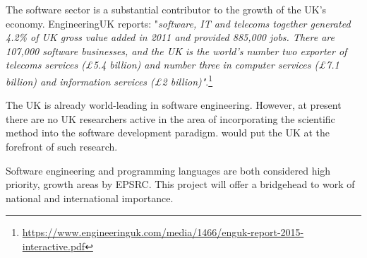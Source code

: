 The software sector is a substantial contributor to the growth of the UK's economy. EngineeringUK reports: "\textit{software, IT and telecoms together generated 4.2\% of UK gross value added in 2011 and provided 885,000 jobs. There are 107,000 software businesses, and the UK is the world's number two exporter of telecoms services (£5.4 billion) and number three in computer services (£7.1 billion) and information services (£2 billion)"}.\footnote{\url{https://www.engineeringuk.com/media/1466/enguk-report-2015-interactive.pdf}}

The UK is already world-leading in software engineering. However, at
present there are no UK researchers active in the area of incorporating the scientific method into the software development paradigm. \project{} would put the UK at the forefront of such research. 

Software engineering and programming languages are both considered high priority, growth areas by
EPSRC\@. This project will offer a bridgehead to work of national and international importance.
